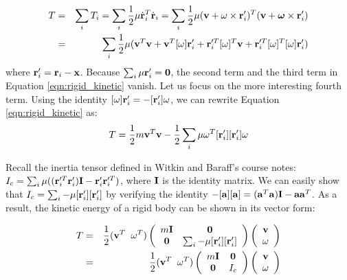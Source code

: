 \begin{eqnarray}
\label{eqn:rigid_kinetic}
T &=& \sum_i T_i = \sum_i \frac{1}{2}  \mathbf{\mu} \dot{\mathbf{r}}_i^{T}
    \dot{\mathbf{r}}_i = \sum_i \frac{1}{2}  \mathbf{\mu} (\mathbf{v} + \omega
    \times \mathbf{r}_i')^T (\mathbf{v} + \boldsymbol{\omega}
    \times \mathbf{r}_i') \nonumber \\
 &=& \sum_i \frac{1}{2}  \mathbf{\mu} (\mathbf{v}^T\mathbf{v} +
    \mathbf{v}^T [\omega] \mathbf{r}_i' + \mathbf{r}_i'^T [\omega]^T \mathbf{v} +
    \mathbf{r}_i'^T [\omega]^T [\omega] \mathbf{r}_i')
\end{eqnarray}
where $\mathbf{r}_i' = \mathbf{r}_i - \mathbf{x}$. Because $\sum_i \mathbf{\mu}
\mathbf{r}_i' = \mathbf{0}$, the second term and the third term in Equation
\ref{eqn:rigid_kinetic} vanish. Let us focus on the more interesting
fourth term. Using the identity $[\omega]\mathbf{r}_i' =
-[\mathbf{r}_i']\omega$, we can rewrite Equation \ref{eqn:rigid_kinetic}
as:
\begin{equation}
T = \frac{1}{2} m \mathbf{v}^T\mathbf{v} - \frac{1}{2} \sum_i \mathbf{\mu}
\omega^T [\mathbf{r}_i'][\mathbf{r}_i'] \omega
\end{equation}

Recall the inertia tensor defined in Witkin and
Baraff's course notes: $I_c = \sum_i \mathbf{\mu} ((\mathbf{r}_i'^T
\mathbf{r}_i')\mathbf{I} - \mathbf{r}_i' \mathbf{r}_i'^T)$, where $\mathbf{I}$ is the
identity matrix. We can easily show that
$I_c = \sum_i -\mathbf{\mu} [\mathbf{r}_i'][\mathbf{r}_i']$ by verifying the
identity $-[\mathbf{a}][\mathbf{a}] = (\mathbf{a}^T\mathbf{a}) \mathbf{I}  -
\mathbf{a}\mathbf{a}^T$. As a result, the kinetic energy of a rigid body can
be shown in its vector form:

\begin{eqnarray}
T &=& \frac{1}{2} (\mathbf{v}^T \;\; \omega^T)
\left(
\begin{array}{cc}
m\mathbf{I} & \mathbf{0} \\
\mathbf{0} & \sum_i -\mathbf{\mu} [\mathbf{r}_i'][\mathbf{r}_i']
\end{array}
\right)
\left(
\begin{array}{c}
\mathbf{v} \\
\omega 
\end{array}
\right) \nonumber \\
&=& \frac{1}{2} (\mathbf{v}^T \;\; \omega^T)
\left(
\begin{array}{cc}
m\mathbf{I} & \mathbf{0} \\
\mathbf{0} & I_c
\end{array}
\right)
\left(
\begin{array}{c}
\mathbf{v} \\
\omega 
\end{array}
\right)
\end{eqnarray}

